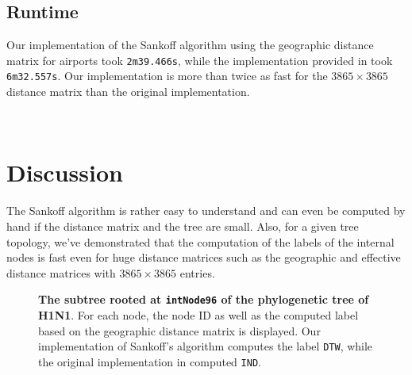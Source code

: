 \documentclass{article}
\begin{document}
\subsection{Runtime}
Our implementation of the Sankoff algorithm using the geographic distance matrix
for airports took \texttt{2m39.466s}, while the implementation provided in
\cite{reimeringPhylogeographicReconstructionUsing2020} took \texttt{6m32.557s}.
Our implementation is more than twice as fast for the $3865 \times 3865$
distance matrix than the original implementation.

\ \\
\section{Discussion}
The Sankoff algorithm is rather easy to understand and can even be computed by
hand if the distance matrix and the tree are small. Also, for a given tree
topology, we've demonstrated that the computation of the labels of the internal
nodes is fast even for huge distance matrices such as the geographic and
effective distance matrices with $3865 \times 3865$ entries.

\begin{figure}[h]
    \centering
    \caption{\textbf{The subtree rooted at \texttt{intNode96} of the
    phylogenetic tree of H1N1}. For each node, the node ID as well as the
    computed label based on the geographic distance matrix is displayed. Our
    implementation of Sankoff's algorithm computes the label \texttt{DTW}, while
    the original implementation in
    \cite{reimeringPhylogeographicReconstructionUsing2020} computed
    \texttt{IND}.}
    \label{fig:subtree}
  \end{figure}
\end{document}
